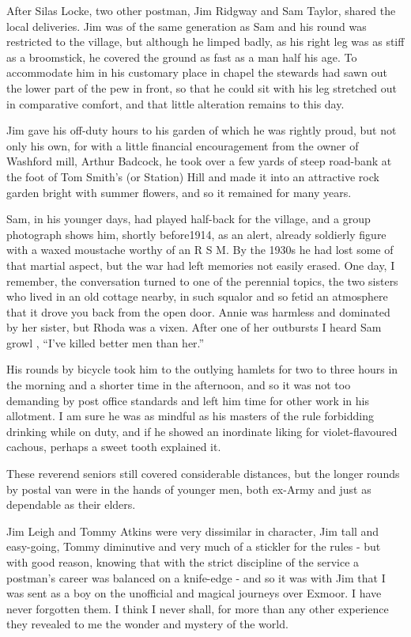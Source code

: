 After Silas Locke, two other postman, Jim Ridgway and Sam Taylor, shared the local deliveries. Jim was of the same generation as Sam and his round was restricted to the village, but although he limped badly, as his right leg was as stiff as a broomstick, he covered the ground as fast as a man half his age. To accommodate him in his customary place in chapel the stewards had sawn out the lower part of the pew in front, so that he could sit with his leg stretched out in comparative comfort, and that little alteration remains to this day.

Jim gave his off-duty hours to his garden of which he was rightly proud, but not only his own, for with a little financial encouragement from the owner of Washford mill, Arthur Badcock, he took over a few yards of steep road-bank at the foot of Tom Smith’s (or Station) Hill and made it into an attractive rock garden bright with summer flowers, and so it remained for many years. 	

Sam, in his younger days, had played half-back for the village, and a group photograph shows him, shortly before1914, as an alert, already soldierly figure with a waxed moustache worthy of an R S M. By the 1930s he had lost some of that martial aspect, but the war had left memories not easily erased. One day, I remember, the conversation turned to one of the perennial topics, the two sisters who lived in an old cottage nearby, in such squalor and so fetid an atmosphere that it drove you back from the open door. Annie was harmless and dominated by her sister, but Rhoda was a vixen. After one of her outbursts I heard Sam growl , “I’ve killed better men than her.”

His rounds by bicycle took him to the outlying hamlets for two to three hours in the morning and a shorter time in the afternoon, and so it was not too demanding by post office standards and left him time for other work in his allotment. I am sure he was as mindful as his masters of the rule forbidding drinking while on duty, and if he showed an inordinate liking for violet-flavoured cachous, perhaps a sweet tooth explained it. 

\Flourish

These reverend seniors still covered considerable distances, but the longer rounds by postal van were in the hands of younger men, both ex-Army and just as dependable as their elders. 

Jim Leigh and Tommy Atkins were very dissimilar in character, Jim tall and easy-going, Tommy diminutive and very much of a stickler for the rules - but with good reason, knowing that with the strict discipline of the service a postman’s career was balanced on a knife-edge - and so it was with Jim that I was sent as a boy on the unofficial and magical journeys over Exmoor. I have never forgotten them. I think I never shall, for more than any other experience they revealed to me the wonder and mystery of the world. 

